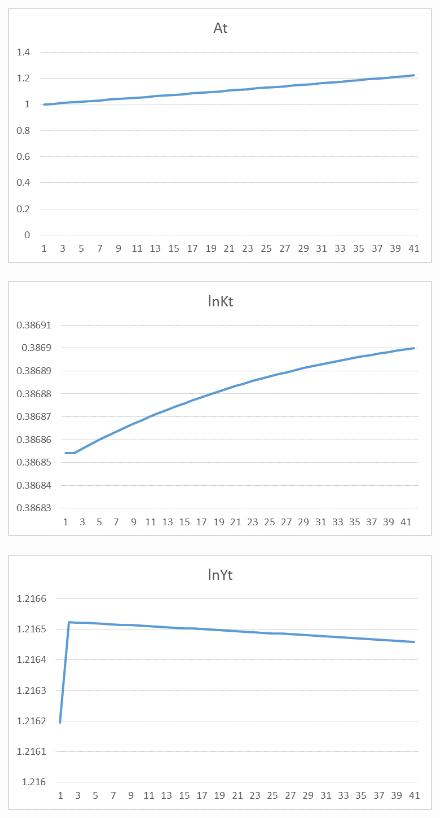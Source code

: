 \documentclass{amsart}
\theoremstyle{plain}
\begin{document}
\begin{figure}[H]
\includegraphics[scale=.50]{13d.png}
\end{figure}
\begin{figure}[H]
\includegraphics[scale=.50]{13e.png}
\end{figure}
\begin{figure}[H]
\includegraphics[scale=.50]{13f.png}
\end{figure}
\end{document}
